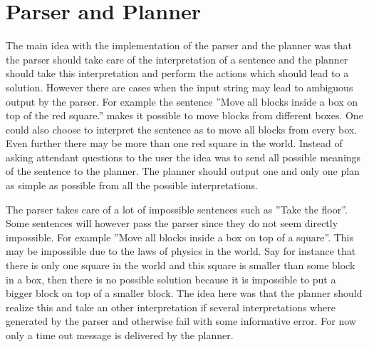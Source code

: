 \section{Parser and Planner}

The main idea with the implementation of the parser and the planner was that the
parser should take care of the interpretation of a sentence and the planner
should take this interpretation and perform the actions which should lead to a
solution. However there are cases when the input string may lead to ambiguous
output by the parser. For example the sentence ''Move all blocks inside a box on
top of the red square.'' makes it possible to move blocks from different boxes.
One could also choose to interpret the sentence as to move all blocks from every
box. Even further there may be more than one red square in the world. Instead of
asking attendant questions to the user the idea was to send all possible
meanings of the sentence to the planner. The planner should output one and only
one plan as simple as possible from all the possible interpretations. 

The parser takes care of a lot of impossible sentences such as ''Take the
floor''. Some sentences will however pass the parser since they do not seem
directly impossible. For example ''Move all blocks inside a box on top of a
square''. This may be impossible due to the laws of physics in the world. Say
for instance that there is only one square in the world and this square is
smaller than some block in a box, then there is no possible solution because it
is impossible to put a bigger block on top of a smaller block. The idea here was
that the planner should realize this and take an other interpretation if several
interpretations where generated by the parser and otherwise fail with some
informative error. For now only a time out message is delivered by the planner.           



